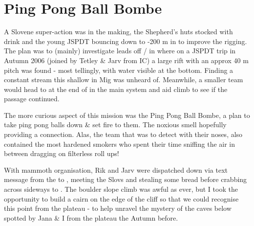 \section{Ping Pong Ball Bombe}



A Slovene super-action was in the making, the Shepherd's huts stocked
with drink and the young JSPDT bouncing down to -200 m in
 to improve the rigging. The plan was to (mainly)
investigate leads off / in  where on a JSPDT
trip in Autumn 2006 (joined by Tetley \& Jarv from IC) a large rift with
an approx 40 m pitch was found - most tellingly, with water visible at
the bottom. Finding a constant stream this shallow in Mig was unheard
of. Meanwhile, a smaller team would head to  at the
end of  in the main system and aid climb to see if the
passage continued.

The more curious aspect of this mission was the Ping Pong Ball Bombe, a
plan to take ping pong balls down  \& set fire to
them. The noxious smell hopefully providing a connection. Alas, the
 team that was to detect with their noses, also contained the most
hardened smokers who spent their time sniffing the air in between
dragging on filterless roll ups!

With mammoth organisation, Rik and Jarv were dispatched down via text
message from the  to , meeting the Slovs and stealing some bread
before crabbing across sideways to . The boulder slope
climb was awful as ever, but I took the opportunity to build a cairn on
the edge of the cliff so that we could recognise this point from the
plateau - to help unravel the mystery of the caves below  spotted by
Jana \& I from the plateau the Autumn before.

